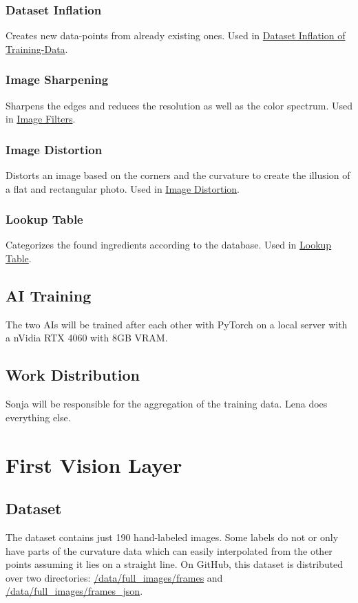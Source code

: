 \documentclass[a4paper,11pt]{report}
\begin{document}
            \subsection{Dataset Inflation}
                Creates new data-points from already existing ones. Used in \hyperref[subsec:data:inflation]{Dataset Inflation of Training-Data}.

            \subsection{Image Sharpening}
                Sharpens the edges and reduces the resolution as well as the color spectrum. Used in \hyperref[subsec:architecture:filters]{Image Filters}.

            \subsection{Image Distortion}
                Distorts an image based on the corners and the curvature to create the illusion of a flat and rectangular photo. Used in \hyperref[subsec:architecture:distortion]{Image Distortion}.

            \subsection{Lookup Table}
                Categorizes the found ingredients according to the database. Used in \hyperref[subsec:architecture:table]{Lookup Table}.

        \section{AI Training}
            The two AIs will be trained after each other with PyTorch \cite{pytorch} on a local server with a nVidia RTX 4060 with 8GB VRAM.

        \section{Work Distribution}
            Sonja will be responsible for the aggregation of the training data. Lena does everything else.
            
            
    \chapter{First Vision Layer}
    
        \section{Dataset}
            The dataset contains just 190 hand-labeled images. Some labels do not or only have parts of the curvature data which can easily interpolated from the other points assuming it lies on a straight line. On GitHub, this dataset is distributed over two directories: \href{https://github.com/lenamerkli/ingredient-scanner/tree/main/data/full_images/frames}{/data/full\_images/frames} and \href{https://github.com/lenamerkli/ingredient-scanner/tree/main/data/full_images/frames_json}{/data/full\_images/frames\_json}.
    
\end{document}
